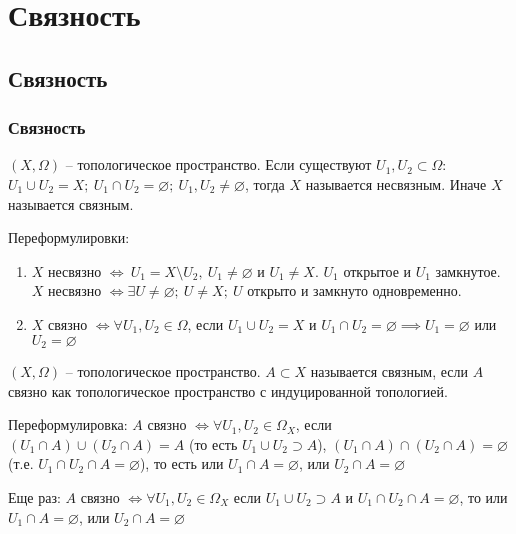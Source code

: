 \documentclass[main]{subfiles}
\begin{document}
\chapter{Связность}
\section{Связность}
\subsection{Связность}
\begin{definition}
    $(X, \Omega)$ -- топологическое пространство.
    Если существуют $U_1, U_2 \subset \Omega$:
    $U_1 \cup U_2 = X;\ U_1 \cap U_2 = \varnothing;\ U_1, U_2 \neq \varnothing$,
    тогда $X$ называется несвязным. Иначе $X$ называется связным.
\end{definition}

Переформулировки:
\begin{enumerate}
    \item $X$ несвязно $\Leftrightarrow\ U_1 = X \setminus U_2,\ U_1 \neq \varnothing$ и $U_1 \neq X$. $U_1$ открытое и $U_1$ замкнутое.
          $X$ несвязно $\Leftrightarrow \exists U \neq \varnothing;\ U \neq X;\ U$ открыто и замкнуто одновременно.
    \item $X$ связно $\Leftrightarrow \forall U_1, U_2 \in \Omega$, если $U_1 \cup U_2 = X$ и $U_1 \cap U_2 = \varnothing \implies U_1 = \varnothing$ или $U_2 = \varnothing$
\end{enumerate}

\begin{definition}
    $(X, \Omega)$ -- топологическое пространство. $A \subset X$ называется связным, если $A$ связно как топологическое пространство с индуцированной топологией.
\end{definition}

Переформулировка: $A$ связно $\Leftrightarrow \forall U_1, U_2 \in \Omega_X$, если $(U_1 \cap A) \cup (U_2 \cap A) =  A$ (то есть $U_1 \cup U_2 \supset A$),
$(U_1 \cap A) \cap (U_2 \cap A) = \varnothing$ (т.е. $U_1 \cap U_2 \cap A = \varnothing$), то есть или $U_1 \cap A = \varnothing$, или $U_2 \cap A = \varnothing$

Еще раз: $A$ связно $\Leftrightarrow \forall U_1, U_2 \in \Omega_X$ если $U_1 \cup U_2 \supset A$ и $U_1 \cap U_2 \cap A = \varnothing$, то или $U_1 \cap A = \varnothing$, или $U_2 \cap A = \varnothing$
\end{document}
